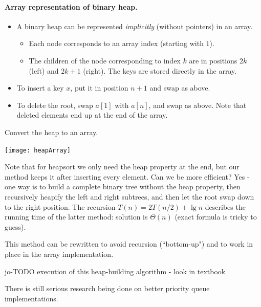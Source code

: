 \paragraph{Array representation of binary heap.}
\begin{itemize}
\item  A binary heap can be represented \emph{implicitly} (without pointers) in 
an array. 
\begin{itemize}
\item Each node corresponds to an array index (starting with $1$). 
\item The  children of the node corresponding to index $k$ are in positions $2k$ 
(left) and $2k+1$ (right). The keys are stored directly in the array.
\end{itemize}
\item To insert a key $x$, put it in position $n+1$ and swap as above.
\item To delete the root, swap $a[1]$ with $a[n]$, and swap as above. Note that
 deleted elements end up at the end of the array.
\end{itemize}

\begin{Boxample}[0]
Convert the heap to an array. 
\begin{center}
\texttt{[image: heapArray]}
\end{center}
\end{Boxample}

Note that for heapsort we only need the heap property at the end, but our method keeps it after inserting every element. 
Can we be more efficient? Yes - one way is to build a complete binary tree without the heap property, then
 recursively heapify the left and right subtrees, and then let the root swap 
 down to the right position. The recursion $T(n) = 2T(n/2) + \lg n$ describes the running time of the 
 latter method: solution is $\Theta(n)$ (exact formula is tricky to guess).
 
This method can be rewritten to avoid recursion (``bottom-up") and to work 
in place in the array implementation. 

\begin{Boxample}[4]
jo-TODO execution of this heap-building algorithm - look in textbook

\end{Boxample}

There is still serious research being done on better priority queue 
implementations.


